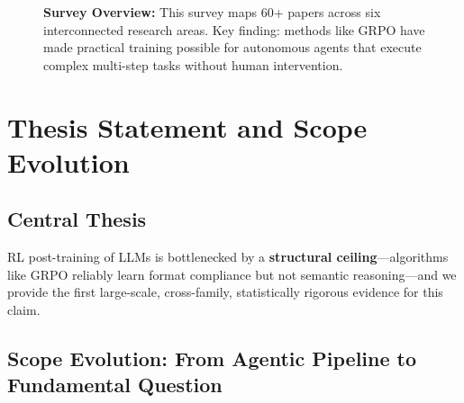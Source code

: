 \documentclass[12pt,a4paper]{report}
\theoremstyle{definition}
\begin{document}
\begin{figure}[htbp]
\caption*{\textbf{Survey Overview:} This survey maps 60+ papers across six interconnected research areas. Key finding: methods like GRPO have made practical training possible for autonomous agents that execute complex multi-step tasks without human intervention.
}
\end{figure}

\tableofcontents

\cleardoublepage{}
{}
\listoffigures

\cleardoublepage{}
{}
\listoftables



\tableofcontents

\listoftables

\listoffigures

\clearpage



\chapter*{Thesis Statement and Scope Evolution}
\label{ch:thesis}

\section*{Central Thesis}

\begin{tcolorbox}[colback=blue!5!white, colframe=blue!60!black, title=\textbf{Thesis (one sentence)}]
RL post-training of LLMs is bottlenecked by a \textbf{structural ceiling}---algorithms like GRPO reliably learn format compliance but not semantic reasoning---and we provide the first large-scale, cross-family, statistically rigorous evidence for this claim.
\end{tcolorbox}

\section*{Scope Evolution: From Agentic Pipeline to Fundamental Question}
\end{document}
